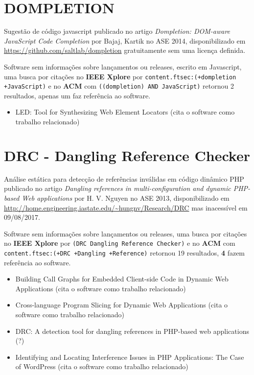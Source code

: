 \section{DOMPLETION}

Sugestão de código javascript
publicado no artigo {\it Dompletion: DOM-aware JavaScript Code Completion}
por Bajaj, Kartik
no ASE 2014,
disponibilizado em \url{https://github.com/saltlab/dompletion}
gratuitamente
sem uma licença definida.

Software sem informações sobre lançamentos ou releases,
escrito em Javascript,
uma busca por citações no {\bf IEEE Xplore} por
\texttt{content.ftsec:(+dompletion +JavaScript)}
e no {\bf ACM} com
\texttt{((dompletion) AND JavaScript)}
retornou
2 resultados,
apenas um faz referência ao software.

\begin{itemize}
\item LED: Tool for Synthesizing Web Element Locators (cita o software como trabalho relacionado)
\end{itemize}

\section{DRC - Dangling Reference Checker}

Análise estática para detecção de referências inválidas em código dinâmico PHP
publicado no artigo {\it Dangling references in multi-configuration and dynamic PHP-based Web applications}
por H. V. Nguyen
no ASE 2013,
disponibilizado em \url{http://home.engineering.iastate.edu/~hungnv/Research/DRC}
mas inacessível em 09/08/2017.

Software sem informações sobre lançamentos ou releases,
uma busca por citações no {\bf IEEE Xplore} por
\texttt{(DRC Dangling Reference Checker)}
e no {\bf ACM} com
\texttt{content.ftsec:(+DRC +Dangling +Reference)}
retornou
19 resultados,
{\bf 4} fazem referência ao software.

\begin{itemize}
\item Building Call Graphs for Embedded Client-side Code in Dynamic Web Applications (cita o software como trabalho relacionado)
\item Cross-language Program Slicing for Dynamic Web Applications (cita o software como trabalho relacionado)
\item DRC: A detection tool for dangling references in PHP-based web applications (?)
\item Identifying and Locating Interference Issues in PHP Applications: The Case of WordPress (cita o software como trabalho relacionado)
\end{itemize}

